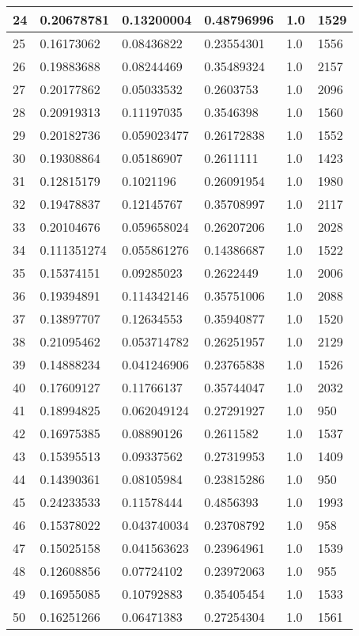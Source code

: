 \begin{longtable}{|l|l|l|l|l|l|}
24 & 0.20678781 & 0.13200004 & 0.48796996 & 1.0 & 1529 \\ \hline 
25 & 0.16173062 & 0.08436822 & 0.23554301 & 1.0 & 1556 \\ \hline 
26 & 0.19883688 & 0.08244469 & 0.35489324 & 1.0 & 2157 \\ \hline 
27 & 0.20177862 & 0.05033532 & 0.2603753 & 1.0 & 2096 \\ \hline 
28 & 0.20919313 & 0.11197035 & 0.3546398 & 1.0 & 1560 \\ \hline 
29 & 0.20182736 & 0.059023477 & 0.26172838 & 1.0 & 1552 \\ \hline 
30 & 0.19308864 & 0.05186907 & 0.2611111 & 1.0 & 1423 \\ \hline 
31 & 0.12815179 & 0.1021196 & 0.26091954 & 1.0 & 1980 \\ \hline 
32 & 0.19478837 & 0.12145767 & 0.35708997 & 1.0 & 2117 \\ \hline 
33 & 0.20104676 & 0.059658024 & 0.26207206 & 1.0 & 2028 \\ \hline 
34 & 0.111351274 & 0.055861276 & 0.14386687 & 1.0 & 1522 \\ \hline 
35 & 0.15374151 & 0.09285023 & 0.2622449 & 1.0 & 2006 \\ \hline 
36 & 0.19394891 & 0.114342146 & 0.35751006 & 1.0 & 2088 \\ \hline 
37 & 0.13897707 & 0.12634553 & 0.35940877 & 1.0 & 1520 \\ \hline 
38 & 0.21095462 & 0.053714782 & 0.26251957 & 1.0 & 2129 \\ \hline 
39 & 0.14888234 & 0.041246906 & 0.23765838 & 1.0 & 1526 \\ \hline 
40 & 0.17609127 & 0.11766137 & 0.35744047 & 1.0 & 2032 \\ \hline 
41 & 0.18994825 & 0.062049124 & 0.27291927 & 1.0 & 950 \\ \hline 
42 & 0.16975385 & 0.08890126 & 0.2611582 & 1.0 & 1537 \\ \hline 
43 & 0.15395513 & 0.09337562 & 0.27319953 & 1.0 & 1409 \\ \hline 
44 & 0.14390361 & 0.08105984 & 0.23815286 & 1.0 & 950 \\ \hline 
45 & 0.24233533 & 0.11578444 & 0.4856393 & 1.0 & 1993 \\ \hline 
46 & 0.15378022 & 0.043740034 & 0.23708792 & 1.0 & 958 \\ \hline 
47 & 0.15025158 & 0.041563623 & 0.23964961 & 1.0 & 1539 \\ \hline 
48 & 0.12608856 & 0.07724102 & 0.23972063 & 1.0 & 955 \\ \hline 
49 & 0.16955085 & 0.10792883 & 0.35405454 & 1.0 & 1533 \\ \hline 
50 & 0.16251266 & 0.06471383 & 0.27254304 & 1.0 & 1561 \\ \hline 
\end{longtable}